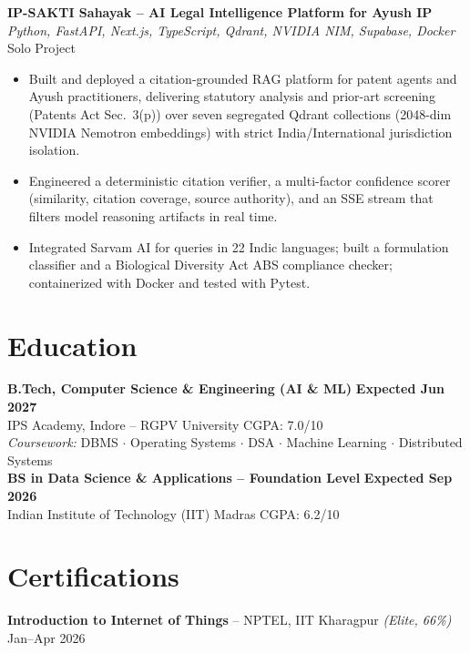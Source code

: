 \documentclass[letterpaper,11pt]{article}
\begin{document}
\vspace{1pt}
\textbf{IP-SAKTI Sahayak -- AI Legal Intelligence Platform for Ayush IP} \\
\hspace*{0.15in}\textit{Python, FastAPI, Next.js, TypeScript, Qdrant, NVIDIA NIM, Supabase, Docker} \hfill Solo Project
\begin{itemize}[leftmargin=0.32in,labelsep=0.45em,itemsep=2pt,topsep=2pt,partopsep=0pt,parsep=0pt]
  \item Built and deployed a citation-grounded RAG platform for patent agents and Ayush practitioners,
        delivering statutory analysis and prior-art screening (Patents Act Sec.~3(p)) over seven
        segregated Qdrant collections (2048-dim NVIDIA Nemotron embeddings) with strict
        India/International jurisdiction isolation.
  \item Engineered a deterministic citation verifier, a multi-factor confidence scorer (similarity, citation
        coverage, source authority), and an SSE stream that filters model reasoning artifacts in real time.
  \item Integrated Sarvam AI for queries in 22 Indic languages; built a formulation classifier and a
        Biological Diversity Act ABS compliance checker; containerized with Docker and tested with Pytest.
\end{itemize}

\section{Education}
\textbf{B.Tech, Computer Science \& Engineering (AI \& ML)} \hfill \textbf{Expected Jun 2027} \\
IPS Academy, Indore -- RGPV University \hfill CGPA: 7.0/10 \\
\textit{Coursework:} DBMS $\cdot$ Operating Systems $\cdot$ DSA $\cdot$ Machine Learning $\cdot$ Distributed Systems \\[3pt]
\textbf{BS in Data Science \& Applications -- Foundation Level} \hfill \textbf{Expected Sep 2026} \\
Indian Institute of Technology (IIT) Madras \hfill CGPA: 6.2/10

\section{Certifications}
\textbf{Introduction to Internet of Things} -- NPTEL, IIT Kharagpur \textit{(Elite, 66\%)} \hfill Jan--Apr 2026
\end{document}
